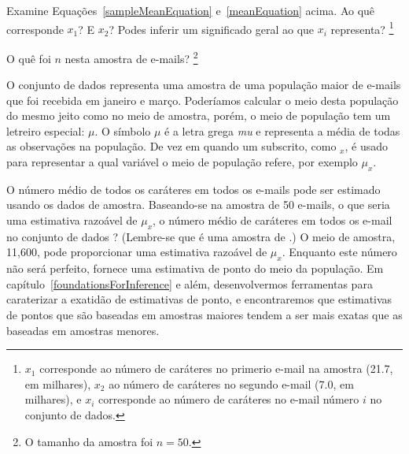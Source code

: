 \begin{exercise}
 Examine Equações~\eqref{sampleMeanEquation} e~\eqref{meanEquation} acima.
 Ao quê corresponde $x_1$?
 E $x_2$?
 Podes inferir um significado geral ao que $x_i$ representa?
 \footnote{
  $x_1$ corresponde ao número de caráteres no primerio e-mail na amostra (21.7, em milhares), $x_2$ ao número de caráteres no segundo e-mail (7.0, em milhares), e $x_i$ corresponde ao número de caráteres no e-mail número $i$ no conjunto de dados.
 }
\end{exercise}

\begin{exercise}
 O quê foi $n$ nesta amostra de e-mails?
 \footnote{O tamanho da amostra foi $n=50$.}
\end{exercise}

O conjunto de dados  representa uma amostra de uma população maior de e-mails que foi recebida em janeiro e março.
Poderíamos calcular o meio desta população do mesmo jeito como no meio de amostra, porém, o meio de população tem um letreiro especial:
$\mu$.
 O símbolo $\mu$ é a letra grega \emph{mu} e representa a média de todas as observações na população.
De vez em quando um subscrito, como $_x$, é usado para representar a qual variável o meio de população refere, por exemplo $\mu_x$.

\begin{example}{
  O número médio de todos os caráteres em todos os e-mails pode ser estimado usando os dados de amostra.
  Baseando-se na amostra de 50 e-mails, o que seria uma estimativa razoável de $\mu_x$, o número médio de caráteres em todos os e-mail no conjunto de dados ?
 (Lembre-se que  é uma amostra de .)}
 O meio de amostra, 11,600, pode proporcionar uma estimativa razoável de $\mu_x$.
 Enquanto este número não será perfeito, fornece uma estimativa de ponto do meio da população.
 Em capítulo~\ref{foundationsForInference} e além, desenvolvermos ferramentas para caraterizar a exatidão de estimativas de ponto, e encontraremos que estimativas de pontos que são baseadas em amostras maiores tendem a ser mais exatas que as baseadas em amostras menores.
\end{example}

